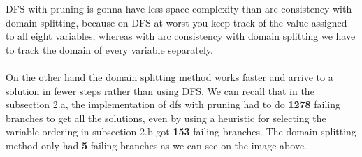 \documentclass{article}
\begin{document}
\begin{enumerate}[label=(\alph*)]
{        DFS with pruning is gonna have less space complexity than arc consistency with domain splitting, 
        because on DFS at worst you keep track of the value assigned to all eight variables, whereas with 
        arc consistency with domain splitting we have to track the domain of every variable separately. \\ \\
        On the other hand the domain splitting method works faster and arrive to a solution in fewer 
        steps rather than using DFS. We can recall that in the subsection 2.a, the implementation of 
        dfs with pruning had to do \textbf{1278} failing branches to get all the solutions, even by 
        using a heuristic for selecting the variable ordering in subsection 2.b got \textbf{153} failing 
        branches. The domain splitting method only had \textbf{5} failing branches as we can see on the 
        image above.
    }
\end{enumerate}

\clearpage
\end{document}
